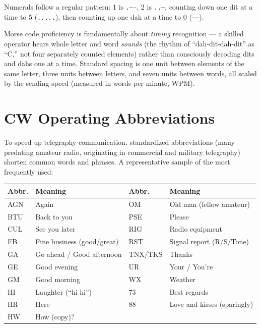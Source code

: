 Numerals follow a regular pattern: 1 is \texttt{.----}, 2 is
\texttt{..---}, counting down one dit at a time to 5 (\texttt{.....}),
then counting up one dah at a time to 0 (\texttt{-----}).

\begin{keyidea}
Morse code proficiency is fundamentally about \emph{timing} recognition
--- a skilled operator hears whole letter and word \emph{sounds} (the
rhythm of ``dah-dit-dah-dit'' as ``C,'' not four separately counted
elements) rather than consciously decoding dits and dahs one at a time.
Standard spacing is one unit between elements of the same letter, three
units between letters, and seven units between words, all scaled by the
sending speed (measured in words per minute, WPM).
\end{keyidea}

\section{CW Operating Abbreviations}

To speed up telegraphy communication, standardized abbreviations
(many predating amateur radio, originating in commercial and military
telegraphy) shorten common words and phrases. A representative sample
of the most frequently used:

\begin{center}
\renewcommand{\arraystretch}{1.15}
\begin{tabularx}{\linewidth}{@{}l Y l Y@{}}
\toprule
Abbr. & Meaning & Abbr. & Meaning \\
\midrule
AGN & Again & OM & Old man (fellow amateur) \\
BTU & Back to you & PSE & Please \\
CUL & See you later & RIG & Radio equipment \\
FB & Fine business (good/great) & RST & Signal report (R/S/Tone) \\
GA & Go ahead / Good afternoon & TNX/TKS & Thanks \\
GE & Good evening & UR & Your / You're \\
GM & Good morning & WX & Weather \\
HI & Laughter (``hi hi'') & 73 & Best regards \\
HR & Here & 88 & Love and kisses (sparingly) \\
HW & How (copy)? & & \\
\bottomrule
\end{tabularx}
\end{center}

